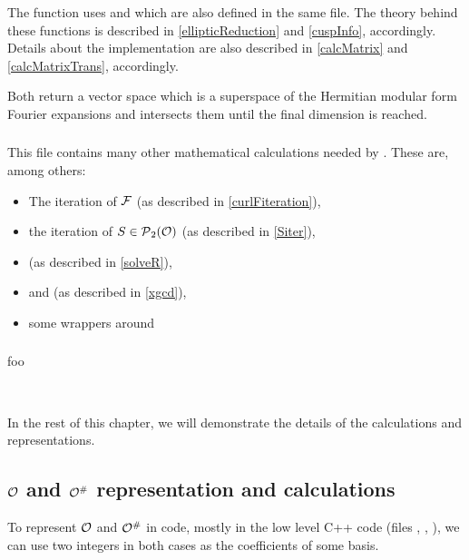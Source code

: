 \subsubsection{}
The function  uses  and  which are also defined in the same file.
The theory behind these functions is described in \cref{ellipticReduction} and \cref{cuspInfo}, accordingly. Details about the implementation are also described in \cref{calcMatrix} and \cref{calcMatrixTrans}, accordingly.

Both return a vector space which is a superspace of the Hermitian modular form Fourier expansions and  intersects them until the final dimension is reached.

\subsubsection{}
This file contains many other mathematical calculations needed by . These are, among others:
\begin{itemize}
\item The iteration of $\mathcal{F}$ (as described in \cref{curlFiteration}),
\item the iteration of $S \in \operatorname{\mathcal{P}}_2(\mathcal{O})$ (as described in \cref{Siter}),
\item {} (as described in \cref{solveR}),
\item {} and  (as described in \cref{xgcd}),
\item some wrappers around 
\end{itemize}

\subsubsection{}
foo


\

In the rest of this chapter, we will demonstrate the details of the calculations and representations.


\subsection{$\mathcal{O}$ and $\mathcal{O}^\#$ representation and calculations}

To represent $\mathcal{O}$ and $\mathcal{O}^\#$ in code, mostly in the low level C++ code (files , , ), we can use two integers in both cases as the coefficients of some basis.

